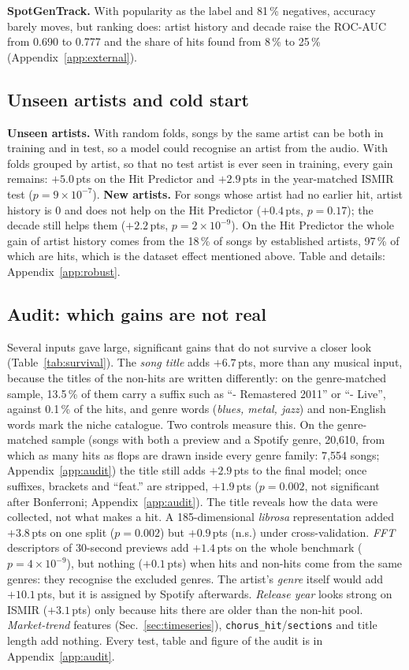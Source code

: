 \documentclass[conference]{IEEEtran}
\newcommand{\pp}{\,pts}
\begin{document}
\textbf{SpotGenTrack.} With popularity as the label and 81\,\% negatives, accuracy barely moves, but ranking does:
artist history and decade raise the ROC-AUC from 0.690 to 0.777 and the share of hits found from 8\,\% to 25\,\%
(Appendix~\ref{app:external}).


\subsection{Unseen artists and cold start}\label{sec:robust}

\textbf{Unseen artists.} With random folds, songs by the same artist can be both in training and in
test, so a model could recognise an artist from the audio. With folds grouped by artist, so that no test artist is
ever seen in training, every gain remains: $+5.0$\pp{} on the Hit Predictor and $+2.9$\pp{} in the year-matched ISMIR
test ($p=9\times10^{-7}$). \textbf{New artists.} For songs whose artist had no earlier hit, artist history is 0 and
does not help on the Hit Predictor ($+0.4$\pp, $p=0.17$); the decade still helps them ($+2.2$\pp, $p=2\times10^{-9}$). On the Hit Predictor
the whole gain of artist history comes from the 18\,\% of songs by established artists, 97\,\% of which are hits,
which is the dataset effect mentioned above. Table and details: Appendix~\ref{app:robust}.


\subsection{Audit: which gains are not real}\label{sec:auditmain}
Several inputs gave large, significant gains that do not survive a closer look (Table~\ref{tab:survival}). The
\emph{song title} adds $+6.7$\pp, more than any musical input, because the titles of the non-hits are written
differently: on the genre-matched sample, 13.5\,\% of them carry a suffix such as ``- Remastered 2011'' or ``- Live'', against 0.1\,\% of the hits,
and genre words (\emph{blues, metal, jazz}) and non-English words mark the niche catalogue. Two controls measure
this. On the genre-matched sample (songs with both a preview and a Spotify genre, 20{,}610, from which as many hits
as flops are drawn inside every genre family: 7{,}554 songs; Appendix~\ref{app:audit}) the title still adds $+2.9$\pp{} to the final model; once suffixes, brackets and
``feat.'' are stripped, $+1.9$\pp{} ($p=0.002$, not significant after Bonferroni; Appendix~\ref{app:audit}). The title
reveals how the data were collected, not what makes a hit. A 185-dimensional \emph{librosa}
representation added $+3.8$\pp{} on one split ($p=0.002$) but $+0.9$\pp{} (n.s.) under cross-validation.
\emph{FFT} descriptors of 30-second previews add $+1.4$\pp{} on the whole benchmark ($p=4\times10^{-9}$), but nothing
($+0.1$\pp) when hits and non-hits come from the same genres: they recognise the excluded genres. The artist's
\emph{genre} itself would add $+10.1$\pp, but it is assigned by Spotify afterwards. \emph{Release year} looks strong on
ISMIR ($+3.1$\pp) only because hits there are older than the non-hit pool. \emph{Market-trend} features
(Sec.~\ref{sec:timeseries}), \texttt{chorus\_hit}/\texttt{sections} and title length add nothing. Every test, table
and figure of the audit is in Appendix~\ref{app:audit}.
\end{document}
